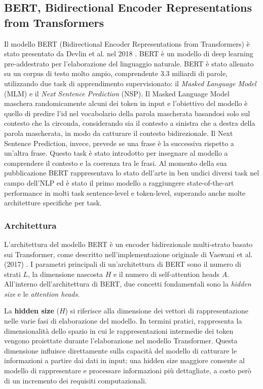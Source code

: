 \documentclass[../../Thesis.tex]{subfiles}
\begin{document}
\subsection{BERT, Bidirectional Encoder Representations from Transformers}
Il modello BERT (Bidirectional Encoder Representations from Transformers) è stato presentato da Devlin et al. nel 2018 \cite{BERT}. BERT è un modello di deep learning pre-addestrato per l'elaborazione del linguaggio naturale. BERT è stato allenato su un corpus di testo molto ampio, comprendente 3.3 miliardi di parole, utilizzando due task di apprendimento supervisionato: il \emph{Masked Language Model} (MLM) e il \emph{Next Sentence Prediction} (NSP). Il Masked Language Model maschera randomicamente alcuni dei token in input e l'obiettivo del modello è quello di predire l'id nel vocabolario della parola mascherata basandosi solo sul contesto che la circonda, considerando sia il contesto a sinistra che a destra della parola mascherata, in modo da catturare il contesto bidirezionale. Il Next Sentence Prediction, invece, prevede se una frase è la successiva rispetto a un'altra frase. Questo task è stato introdotto per insegnare al modello a comprendere il contesto e la coerenza tra le frasi. Al momento della sua pubblicazione BERT rappresentava lo stato dell'arte in ben undici diversi task nel campo dell'NLP ed è stato il primo modello a raggiungere state-of-the-art performance in molti task sentence-level e token-level, superando anche molte architetture specifiche per task. 

\subsubsection{Architettura}
L'architettura del modello BERT è un encoder bidirezionale multi-strato basato sui Transformer, come descritto nell'implementazione originale di Vaswani et al. (2017) \cite{AttentionIsAllYouNeed}. I parametri principali di un'architettura di BERT sono il numero di strati $L$, la dimensione nascosta $H$ e il numero di self-attention heads $A$. All'interno dell'architettura di BERT, due concetti fondamentali sono la \textit{hidden size} e le \textit{attention heads}.

La \textbf{hidden size} ($H$) si riferisce alla dimensione dei vettori di rappresentazione nelle varie fasi di elaborazione del modello. In termini pratici, rappresenta la dimensionalità dello spazio in cui le rappresentazioni intermedie dei token vengono proiettate durante l'elaborazione nel modello Transformer. Questa dimensione influisce direttamente sulla capacità del modello di catturare le informazioni a partire dai dati in input; una hidden size maggiore consente al modello di rappresentare e processare informazioni più dettagliate, a costo però di un incremento dei requisiti computazionali.
\end{document}
